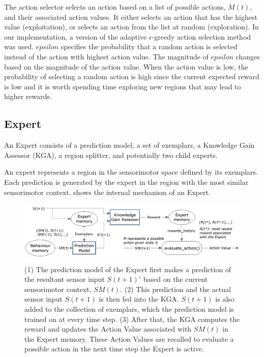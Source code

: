 The action selector selects an action based on a list of possible actions, $M(t)$, and their associated action values. It either selects an action that has the highest value (exploitation), or selects an action from the list at random (exploration). In our implementation, a version of the adaptive $\epsilon$-greedy \cite{Tokic2010} action selection method was used. $epsilon$ specifies the probability that a random action is selected instead of the action with highest action value. The magnitude of $epsilon$ changes based on the magnitude of the action value. When the action value is low, the probability of selecting a random action is high since the current expected reward is low and it is worth spending time exploring new regions that may lead to higher rewards.

\subsection{Expert}

An Expert consists of a prediction model, a set of exemplars, a Knowledge Gain Assessor (KGA), a region splitter, and potentially two child experts. 

An expert represents a region in the sensorimotor space defined by its exemplars. Each prediction is generated by the expert in the region with the most similar sensorimotor context.  shows the internal mechanism of an Expert.

\begin{figure}[!htbp]
	\centering
	\includegraphics[width=1.0 \textwidth]{"fig/cbla/Block Diagram Expert"}
	\caption[Block diagram of the Expert]{(1) The prediction model of the Expert first makes a prediction of the resultant sensor input $S(t+1)'$ based on the current sensorimotor context, $SM(t)$. (2) This prediction and the actual sensor input $S(t+1)$ is then fed into the KGA. $S(t+1)$ is also added to the collection of exemplars, which the prediction model is trained on at every time step. (3) After that, the KGA computes the reward and updates the Action Value associated with $SM(t)$ in the Expert memory. These Action Values are recalled to evaluate a possible action in the next time step the Expert is active.}
	\label{fig:Block Diagram Expert}
\end{figure}

